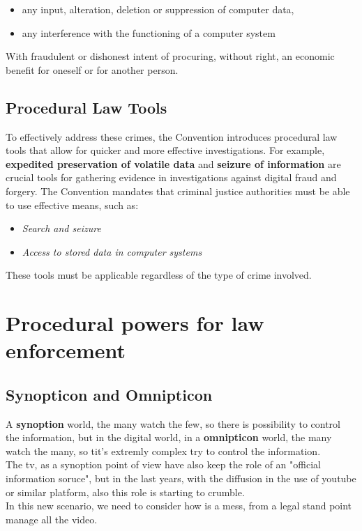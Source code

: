 \begin{itemize}
\item any input, alteration, deletion or suppression of computer data,
\item any interference with the functioning of a computer system
\end{itemize}

With fraudulent or dishonest intent of procuring, without right, an economic benefit for oneself or for another person.

\subsection{Procedural Law Tools}

To effectively address these crimes, the Convention introduces procedural law tools that allow for quicker and more effective investigations. For example, \textbf{expedited preservation of volatile data} and \textbf{seizure of information} are crucial tools for gathering evidence in investigations against digital fraud and forgery. The Convention mandates that criminal justice authorities must be able to use effective means, such as:

\begin{itemize}[itemsep=0pt]
    \item \textit{Search and seizure}
    \item \textit{Access to stored data in computer systems}
\end{itemize}

These tools must be applicable regardless of the type of crime involved.

\section{Procedural powers for law enforcement}

\subsection{Synopticon and Omnipticon}

A \textbf{synoption} world, the many watch the few, so there is possibility to control the information, but in the digital world, in a \textbf{omnipticon} world, the many watch the many, so tit's extremly complex try to control the information. \\
The tv, as a synoption point of view have also keep the role of an "official information soruce", but in the last years, with the diffusion in the use of youtube or similar platform, also this role is starting to crumble. \\
In this new scenario, we need to consider how is a mess, from a legal stand point manage all the video.

